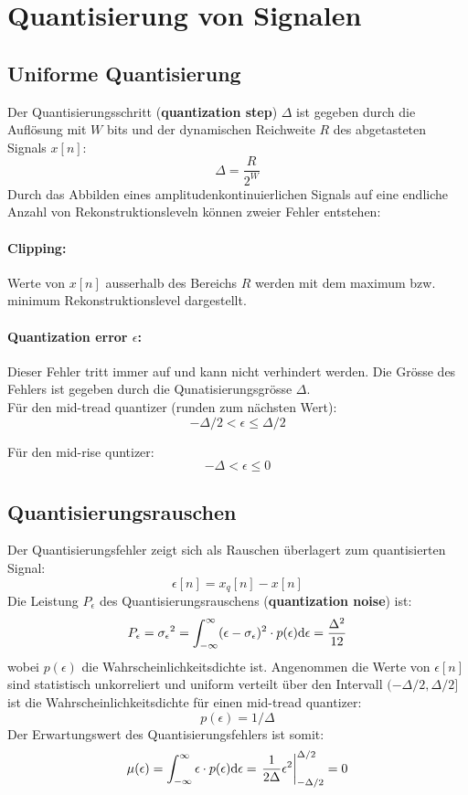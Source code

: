 \section{Quantisierung von Signalen}
\subsection{Uniforme Quantisierung}
Der Quantisierungsschritt (\textbf{quantization step}) $\Delta$ ist gegeben
durch die Auflösung mit $W$ bits und der dynamischen Reichweite $R$ des
abgetasteten Signals $x[n]$:
\[ \Delta = \frac{R}{2^W} \]
Durch das Abbilden eines amplitudenkontinuierlichen Signals auf eine endliche
Anzahl von Rekonstruktionsleveln können zweier Fehler entstehen:\\
\paragraph{Clipping:} Werte von $x[n]$ ausserhalb des Bereichs $R$ werden mit
dem maximum bzw. minimum Rekonstruktionslevel dargestellt.

\paragraph{Quantization error $\epsilon$:} Dieser Fehler tritt immer auf und
kann nicht verhindert werden. Die Grösse des Fehlers ist gegeben durch die
Qunatisierungsgrösse $\Delta$.\\

Für den mid-tread quantizer (runden zum nächsten Wert):
\[ -\Delta/2 < \epsilon \leq \Delta / 2 \]

Für den mid-rise quntizer:
\[ -\Delta < \epsilon \leq 0 \]

\subsection{Quantisierungsrauschen}
Der Quantisierungsfehler zeigt sich als Rauschen überlagert zum quantisierten
Signal:
\[ \epsilon[n] = x_q[n] - x[n] \]
Die Leistung $P_\epsilon$ des Quantisierungsrauschens
(\textbf{quantization noise}) ist:
\[ P_\epsilon = {\sigma_\epsilon}^2 = \int_{-\infty}^{\infty} (\epsilon - 
	{\sigma_\epsilon})^2 \cdot p(\epsilon) \mathrm{d}\epsilon = 
	\frac{\Delta^2}{12}\]
wobei $p(\epsilon)$ die Wahrscheinlichkeitsdichte ist. Angenommen die Werte
von $\epsilon[n]$ sind statistisch unkorreliert und uniform verteilt über den
Intervall $(-\Delta/2, \Delta/2]$ ist die Wahrscheinlichkeitsdichte für einen
mid-tread quantizer:
\[ p(\epsilon) = 1/\Delta \] 
Der Erwartungswert des Quantisierungsfehlers ist somit:
\[ \mu(\epsilon) = \int_{-\infty}^{\infty} \epsilon \cdot p(\epsilon) 
	\mathrm{d}\epsilon = \left. \frac{1}{2\Delta}\epsilon^2
	\right|_{-\Delta/2}^{\Delta/2} = 0 \]

